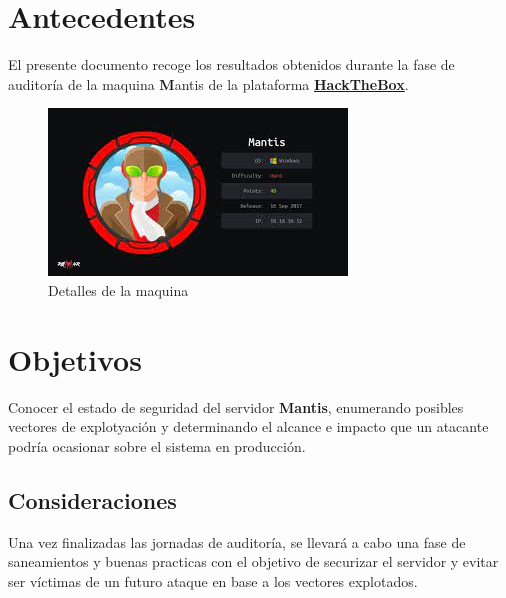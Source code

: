 \documentclass[a4paper]{article} %
\newcommand{\machineName}{Mantis} %
\begin{document}
    \section{Antecedentes}El presente documento recoge los 
    resultados obtenidos durante la fase de auditoría de la 
    maquina {\textbf\machineName} de la plataforma 
    \href{http://www.hackthebox.com}{\textbf{\color{blue}HackTheBox}}.
    \vspace{0.2cm}
    \begin{figure}[h]
    \centering
    \includegraphics[width=\textwidth]{mantis.jpeg}
    \caption{Detalles de la maquina}
    \end{figure}
    \vspace{0.2cm}
    \begin{tcolorbox}[enhanced,attach boxed title to top center={yshift=-3mm,yshifttext=-1mm},
        colback=blue!5!white,colframe=blue!75!black,colbacktitle=greeenPortada!80!black,
        title=Dirección URL,fonttitle=\bfseries,
        boxed title style={size=small,colframe=red!50!black} ]
        \centering
        \href{https://hackthebox.es/home/machines/profile/98}{\color{blue}{https://hackthebox.es/home/machines/profile/98}}
    \end{tcolorbox}
    
    \section{Objetivos}
    Conocer el estado de seguridad del servidor \textbf{\machineName}, 
    enumerando posibles vectores de explotyación y determinando el alcance 
    e impacto que un atacante podría ocasionar sobre el sistema en producción.

    \subsection{Consideraciones}
    Una vez finalizadas las jornadas de auditoría, se llevará a cabo
    una fase de saneamientos y buenas practicas con el objetivo de 
    securizar el servidor y evitar ser víctimas de un futuro ataque 
    en base a los vectores explotados.
    
\end{document}
